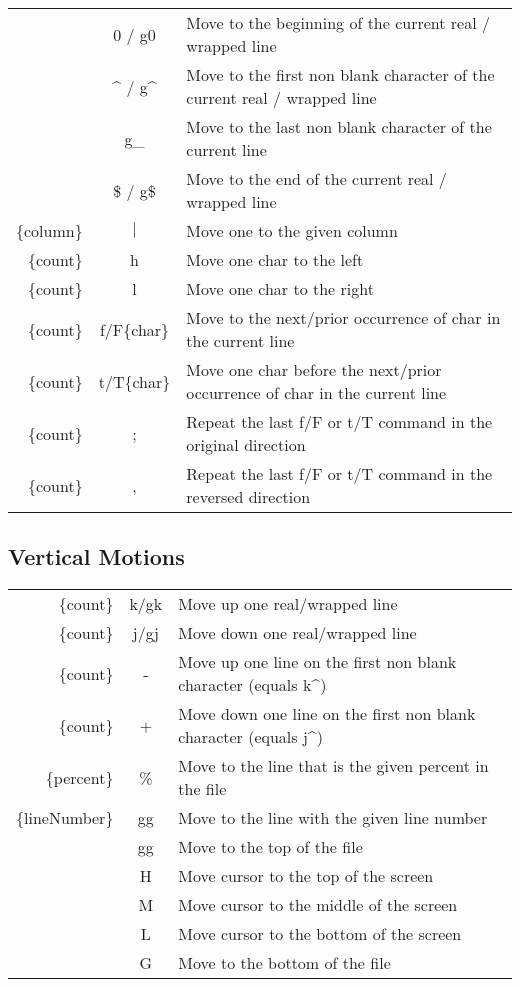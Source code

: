 \documentclass{article}
\begin{document}
\begin{tabular}{ r c l }
 & 0 / g0 & Move to the beginning of the current real / wrapped line \\  [0.5ex]
 & {}\^{} / g\^{} & Move to the first non blank character of the current real / wrapped line \\  [0.5ex]
 & g\_ & Move to the last non blank character of the current line \\  [0.5ex]
 & \$ / g\$ & Move to the end of the current real / wrapped line \\  [0.5ex]
 \{column\} & $\mid$ & Move one to the given column \\[0.5ex]
 \{count\} & h & Move one char to the left \\[0.5ex]
 \{count\} & l & Move one char to the right  \\  [0.5ex]
 \{count\} & f/F\{char\} & Move to the next/prior occurrence of char in the current line \\  [0.5ex]
 \{count\} & t/T\{char\} & Move one char before the next/prior occurrence of char in the current line \\  [0.5ex]
 \{count\} & ; & Repeat the last f/F or t/T command in the original direction\\  [0.5ex]
 \{count\} & , & Repeat the last f/F or t/T command in the reversed direction \\  [0.5ex]
\end{tabular}

\subsection{Vertical Motions}
\begin{tabular}{ r c l }
 \{count\} & k/gk & Move up one real/wrapped line \\[0.5ex]
 \{count\}  & j/gj & Move down one real/wrapped line \\[0.5ex]
 \{count\} & - & Move up one line on the first non blank character (equals k\^{}) \\[0.5ex]
 \{count\} & + & Move down one line on the first non blank character (equals j\^{}) \\[0.5ex]
 \{percent\} & \% & Move to the line that is the given percent in the file\\[0.5ex]
 \{lineNumber\} & gg & Move to the line with the given line number\\[0.5ex]
 & gg & Move to the top of the file \\[0.5ex]
 & H & Move cursor to the top of the screen\\[0.5ex]
 & M & Move cursor to the middle of the screen\\[0.5ex]
 & L & Move cursor to the bottom of the screen\\[0.5ex]
 & G & Move to the bottom of the file \\[0.5ex]
\end{tabular}
\end{document}
